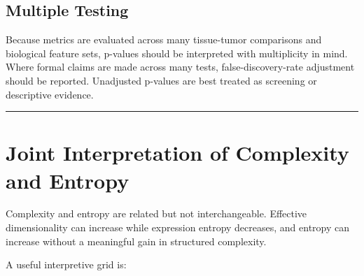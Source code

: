 \documentclass[
  letterpaper,
  DIV=11,
  numbers=noendperiod,
  openany,
  oneside]{scrreprt}
\begin{document}
\subsection{Multiple Testing}\label{multiple-testing}

Because metrics are evaluated across many tissue-tumor comparisons and
biological feature sets, p-values should be interpreted with
multiplicity in mind. Where formal claims are made across many tests,
false-discovery-rate adjustment should be reported. Unadjusted p-values
are best treated as screening or descriptive evidence.

\begin{center}\rule{0.5\linewidth}{0.5pt}\end{center}

\section{Joint Interpretation of Complexity and
Entropy}\label{joint-interpretation-of-complexity-and-entropy}

Complexity and entropy are related but not interchangeable. Effective
dimensionality can increase while expression entropy decreases, and
entropy can increase without a meaningful gain in structured complexity.

A useful interpretive grid is:
\end{document}
